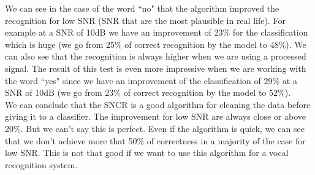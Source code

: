 \documentclass[11pt,a4paper,titlepage]{report}
\begin{document}
We can see in the case of the word ``no" that the algorithm improved the recognition for low SNR (SNR that are the most plausible in real life). For example at a SNR of 10dB we have an improvement of 23$\%$ for the classification which is huge (we go from 25$\%$ of correct recognition by the model to 48$\%$). We can also see that the recognition is always higher when we are using a processed signal.
The result of this test is even more impressive when we are working with the word ``yes" since we have an improvement of the classification of 29$\%$ at a SNR of 10dB (we go from 23$\%$ of correct recognition by the model to 52$\%$).\\
We can conclude that the SNCR is a good algorithm for cleaning the data before giving it to a classifier. The improvement for low SNR are always close or above 20$\%$. But we can't say this is perfect. Even if the algorithm is quick, we can see that we don't achieve more that 50$\%$ of correctness in a majority of the case  for low SNR. This is not that good if we want  to use this algorithm for a vocal recognition system.
\end{document}
